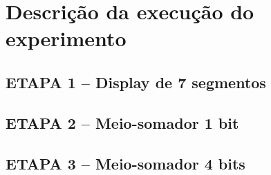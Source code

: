 
\chapter{Descrição da execução do experimento}

\section{ETAPA 1 – Display de 7 segmentos}
\section{ETAPA 2 – Meio-somador 1 bit}
\section{ETAPA 3 – Meio-somador 4 bits}








